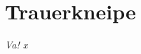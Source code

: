 \section{Trauerkneipe}


\begin{multicols}{2}
	
	\begin{flushright}
		\hfill\emph{Va! x}
	\end{flushright}
\end{multicols}

